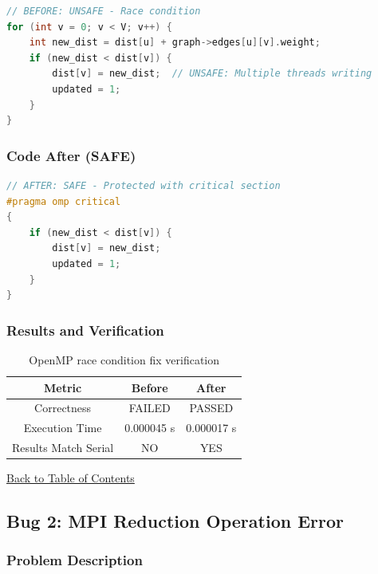 \documentclass[12pt,a4paper]{article}
\begin{document}
\begin{lstlisting}[language=C, caption=OpenMP implementation with race condition]
// BEFORE: UNSAFE - Race condition
for (int v = 0; v < V; v++) {
    int new_dist = dist[u] + graph->edges[u][v].weight;
    if (new_dist < dist[v]) {
        dist[v] = new_dist;  // UNSAFE: Multiple threads writing
        updated = 1;
    }
}
\end{lstlisting}

\subsubsection*{Code After (SAFE)}

\begin{lstlisting}[language=C, caption=OpenMP implementation with critical section]
// AFTER: SAFE - Protected with critical section
#pragma omp critical
{
    if (new_dist < dist[v]) {
        dist[v] = new_dist;
        updated = 1;
    }
}
\end{lstlisting}

\subsubsection*{Results and Verification}

\begin{table}[H]
    \centering
    \begin{tabular}{|c|c|c|}
    \hline
    \textbf{Metric} & \textbf{Before} & \textbf{After} \\
    \hline
    Correctness & FAILED & PASSED \\
    Execution Time & 0.000045 s & 0.000017 s \\
    Results Match Serial & NO & YES \\
    \hline
    \end{tabular}
    \caption{OpenMP race condition fix verification}
    \label{tab:bug1_results}
\end{table}

\hyperref[contents]{\small Back to Table of Contents}

\subsection{Bug 2: MPI Reduction Operation Error}

\subsubsection*{Problem Description}
\end{document}
